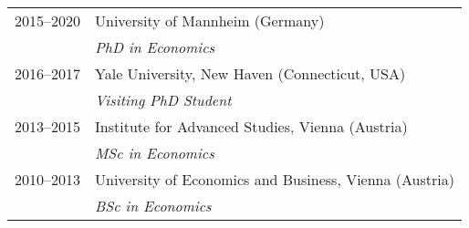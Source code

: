 \documentclass[12pt,a4paper]{book}
\begin{document}
\begin{tabular}{ll}
  2015--2020 & University of Mannheim (Germany) \\
             & \emph{PhD in Economics} \\
  2016--2017 & Yale University, New Haven (Connecticut, USA) \\
             & \emph{Visiting PhD Student} \\
  2013--2015 & Institute for Advanced Studies, Vienna (Austria) \\
             & \emph{MSc in Economics} \\
  2010--2013 & University of Economics and Business, Vienna (Austria) \\
             & \emph{BSc in Economics}
\end{tabular}
\end{document}
